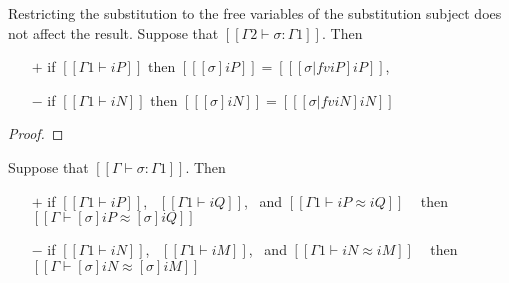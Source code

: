 \begin{lemma}
  \label{lemma:subst-restr-fv}
  Restricting the substitution to the free variables of the
  substitution subject does not affect the result.
  Suppose that $[[Γ2 ⊢ σ : Γ1]]$. Then
  \begin{itemize}
  \item[$+$] if $[[Γ1 ⊢ iP]]$ then $[[ [σ]iP ]] = [[ [σ|fv iP]iP ]]$,
  \item[$-$] if $[[Γ1 ⊢ iN]]$ then $[[ [σ]iN ]] = [[ [σ|fv iN]iN ]]$
  \end{itemize}
\end{lemma}
\begin{proof}
\end{proof}


\begin{corollary}
  \label{corollary:subst-pres-equiv}

  Suppose that $[[Γ ⊢ σ : Γ1]]$. Then
  \begin{itemize}
  \item[$+$] if $[[Γ1 ⊢ iP]]$,~ $[[Γ1 ⊢ iQ]]$,~ and $[[Γ1 ⊢ iP ≈ iQ]]$ ~ then $[[Γ ⊢ [σ]iP ≈ [σ]iQ]]$
  \item[$-$] if $[[Γ1 ⊢ iN]]$,~ $[[Γ1 ⊢ iM]]$,~ and $[[Γ1 ⊢ iN ≈ iM]]$ ~ then $[[Γ ⊢ [σ]iN ≈ [σ]iM]]$
  \end{itemize}
\end{corollary}

